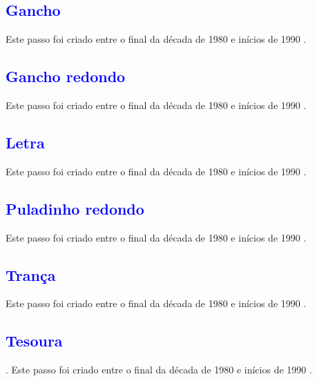 \subsection{\textcolor{blue}{Gancho}} 
Este passo foi  criado entre o final da década de 1980 e inícios de 1990  \cite[pp. 143]{perna2002samba}.

\subsection{\textcolor{blue}{Gancho redondo}} 
Este passo foi  criado entre o final da década de 1980 e inícios de 1990  \cite[pp. 143]{perna2002samba}.

\subsection{\textcolor{blue}{Letra}}
Este passo foi  criado entre o final da década de 1980 e inícios de 1990  \cite[pp. 143]{perna2002samba}.

\subsection{\textcolor{blue}{Puladinho redondo}} 
Este passo foi  criado entre o final da década de 1980 e inícios de 1990  \cite[pp. 143]{perna2002samba}.

\subsection{\textcolor{blue}{Trança}}
Este passo foi  criado entre o final da década de 1980 e inícios de 1990  \cite[pp. 143]{perna2002samba}.

\subsection{\textcolor{blue}{Tesoura}}
.
Este passo foi  criado entre o final da década de 1980 e inícios de 1990  \cite[pp. 143]{perna2002samba}.

